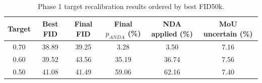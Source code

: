 \begin{table}[t]
\centering
\caption{Phase 1 target recalibration results ordered by best FID50k.}
\label{tab:phase1_inverted_best_fid}
\begin{tabular}{cccccc}
\hline
Target & Best FID & Final FID & Final $p_{ANDA}$ (\%) & NDA applied (\%) & MoU uncertain (\%) \\
\hline
0.70 & 38.89 & 39.25 & 3.28 & 3.50 & 7.16 \\
0.60 & 39.52 & 43.56 & 35.19 & 36.74 & 7.56 \\
0.50 & 41.08 & 41.49 & 59.06 & 62.16 & 7.40 \\
\hline
\end{tabular}
\end{table}
